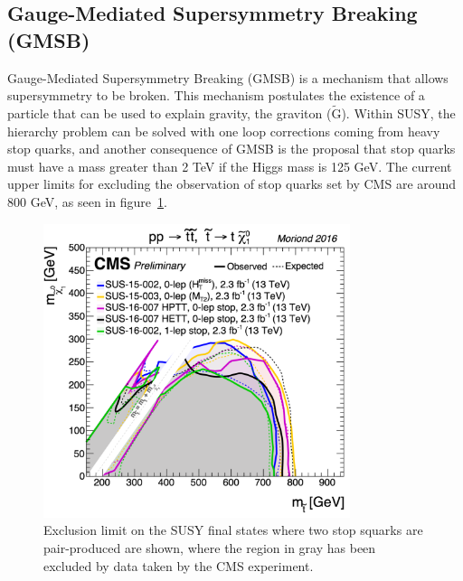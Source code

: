\subsection{Gauge-Mediated Supersymmetry Breaking (GMSB)}
Gauge-Mediated Supersymmetry Breaking (GMSB) is a mechanism that allows supersymmetry to be broken.
This mechanism postulates the existence of a particle that can be used to explain gravity, the graviton ($\mathrm{\tilde{G}}$).
Within SUSY, the hierarchy problem can be solved with one loop corrections coming from heavy stop quarks,
and another consequence of GMSB is the proposal that stop quarks must have a mass greater than 2 TeV if the Higgs mass is 125 GeV.
The current upper limits for excluding the observation of stop quarks set by CMS are around 800 GeV, as seen in figure~\ref{fig:T2tt_limits}.

\begin{figure}[!htb]
  \begin{center}
    \includegraphics[width=0.8\textwidth]{intro/figs/T2tt_moriond2016.pdf}
    \caption{
      \label{fig:T2tt_limits}
      Exclusion limit on the SUSY final states where two stop squarks are pair-produced are shown,
      where the region in gray has been excluded by data taken by the CMS experiment.
    }
  \end{center}
\end{figure}

